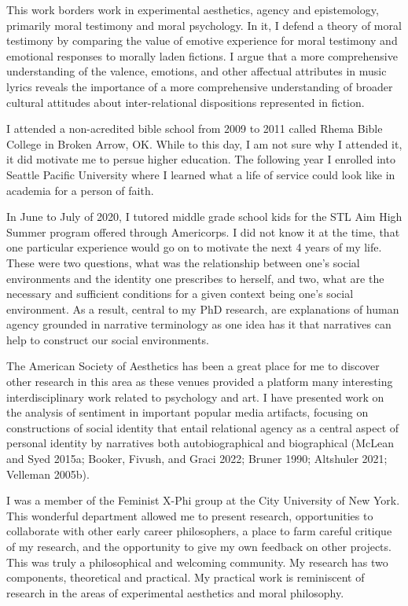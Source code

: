 \documentclass[phdthesis,12pt,final]{wuthesis}
\theoremstyle{definition}
\theoremstyle{definition}
\theoremstyle{definition}
\theoremstyle{definition}
\theoremstyle{remark}
\begin{document}
\cleardoublepage
\begin{thesisacknowledgments}
This work borders work in experimental aesthetics, agency and epistemology, primarily moral testimony and moral psychology. In it, I defend a theory of moral testimony by comparing the value of emotive experience for moral testimony and emotional responses to morally laden fictions. I argue that a more comprehensive understanding of the valence, emotions, and other affectual attributes in music lyrics reveals the importance of a more comprehensive understanding of broader cultural attitudes about inter-relational dispositions represented in fiction.

I attended a non-acredited bible school from 2009 to 2011 called Rhema Bible College in Broken Arrow, OK. While to this day, I am not sure why I attended it, it did motivate me to persue higher education. The following year I enrolled into Seattle Pacific University where I learned what a life of service could look like in academia for a person of faith.

In June to July of 2020, I tutored middle grade school kids for the STL Aim High Summer program offered through Americorps. I did not know it at the time, that one particular experience would go on to motivate the next 4 years of my life. These were two questions, what was the relationship between one's social environments and the identity one prescribes to herself, and two, what are the necessary and sufficient conditions for a given context being one's social environment. As a result, central to my PhD research, are explanations of human agency grounded in narrative terminology as one idea has it that narratives can help to construct our social environments.

The American Society of Aesthetics has been a great place for me to discover other research in this area as these venues provided a platform many interesting interdisciplinary work related to psychology and art. I have presented work on the analysis of sentiment in important popular media artifacts, focusing on constructions of social identity that entail relational agency as a central aspect of personal identity by narratives both autobiographical and biographical (McLean and Syed 2015a; Booker, Fivush, and Graci 2022; Bruner 1990; Altshuler 2021; Velleman 2005b).

I was a member of the Feminist X-Phi group at the City University of New York. This wonderful department allowed me to present research, opportunities to collaborate with other early career philosophers, a place to farm careful critique of my research, and the opportunity to give my own feedback on other projects. This was truly a philosophical and welcoming community. My research has two components, theoretical and practical. My practical work is reminiscent of research in the areas of experimental aesthetics and moral philosophy.


\end{thesisacknowledgments}
\end{document}
